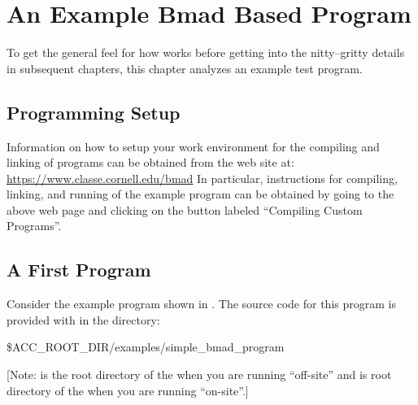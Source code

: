 \chapter{An Example Bmad Based Program}
\label{c:program.info}

To get the general feel for how \bmad works before getting into the nitty--gritty details in
subsequent chapters, this chapter analyzes an example test program.

\section{Programming Setup}
\label{s:prog.setup}

Information on how to setup your work environment for the compiling and linking of programs can be
obtained from the \bmad web site at:
\hfill\break
\hspace*{0.3in}
\url{https://www.classe.cornell.edu/bmad}
In particular, instructions for compiling, linking, and running of the example program can be
obtained by going to the above web page and clicking on the button labeled ``Compiling Custom Programs''.

\section{A First Program}
\label{s:first.program}

Consider the example program shown in . The source code for this program is provided
with \bmad in the directory:
\begin{example}
  \$ACC_ROOT_DIR/examples/simple_bmad_program
\end{example}
[Note:  is the root directory of the \bmad {} when you are running
``off-site'' and is root directory of the  when you are running ``on-site''.]

